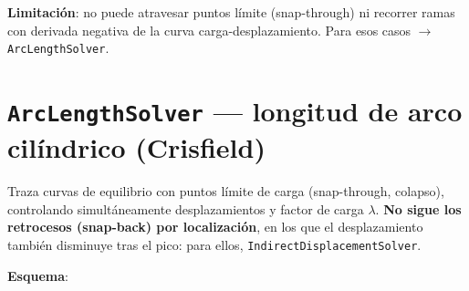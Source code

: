 \documentclass[11pt,oneside]{report}
\begin{document}
\textbf{Limitación}: no puede atravesar puntos límite (snap-through) ni recorrer ramas con derivada negativa de la curva carga-desplazamiento. Para esos casos \ensuremath{\to} \texttt{ArcLengthSolver}.

\section{\texttt{ArcLengthSolver} --- longitud de arco cilíndrico (Crisfield)}

Traza curvas de equilibrio con puntos límite de carga (snap-through, colapso), controlando simultáneamente desplazamientos y factor de carga $\lambda$. \textbf{No sigue los retrocesos (snap-back) por localización}, en los que el desplazamiento también disminuye tras el pico: para ellos, \texttt{IndirectDisplacementSolver}.

\textbf{Esquema}:
\end{document}
